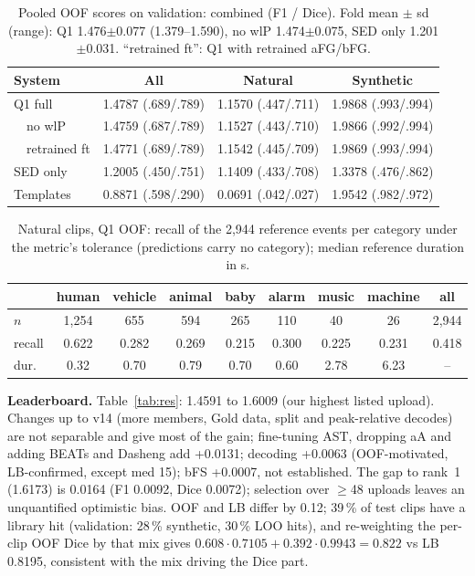 \documentclass[conference]{IEEEtran}
\begin{document}
\begin{table}[t]
\caption{Pooled OOF scores on validation: combined (F1 / Dice). Fold mean $\pm$ sd (range): Q1 1.476$\pm$0.077
(1.379--1.590), no wlP 1.474$\pm$0.075, SED only 1.201$\pm$0.031. ``retrained ft'': Q1 with retrained aFG/bFG.}
\label{tab:comp}
\centering
\scriptsize
\setlength{\tabcolsep}{3pt}
\begin{tabular}{@{}lccc@{}}
\toprule
System & All & Natural & Synthetic \\
\midrule
Q1 full & 1.4787 (.689/.789) & 1.1570 (.447/.711) & 1.9868 (.993/.994) \\
\ \ no wlP & 1.4759 (.687/.789) & 1.1527 (.443/.710) & 1.9866 (.992/.994) \\
\ \ retrained ft & 1.4771 (.689/.789) & 1.1542 (.445/.709) & 1.9869 (.993/.994) \\
SED only & 1.2005 (.450/.751) & 1.1409 (.433/.708) & 1.3378 (.476/.862) \\
Templates & 0.8871 (.598/.290) & 0.0691 (.042/.027) & 1.9542 (.982/.972) \\
\bottomrule
\end{tabular}
\end{table}

\begin{table}[t]
\caption{Natural clips, Q1 OOF: recall of the 2,944 reference events per category under the metric's tolerance
(predictions carry no category); median reference duration in s.}
\label{tab:cat}
\centering
\scriptsize
\setlength{\tabcolsep}{2.5pt}
\begin{tabular}{@{}lcccccccc@{}}
\toprule
 & human & vehicle & animal & baby & alarm & music & machine & all \\
\midrule
$n$ & 1,254 & 655 & 594 & 265 & 110 & 40 & 26 & 2,944 \\
recall & 0.622 & 0.282 & 0.269 & 0.215 & 0.300 & 0.225 & 0.231 & 0.418 \\
dur. & 0.32 & 0.70 & 0.79 & 0.70 & 0.60 & 2.78 & 6.23 & -- \\
\bottomrule
\end{tabular}
\end{table}

\textbf{Leaderboard.} Table~\ref{tab:res}: 1.4591 to 1.6009 (our highest listed upload). Changes up to v14 (more
members, Gold data, split and peak-relative decodes) are not separable and give most of the gain; fine-tuning AST,
dropping aA and adding BEATs and Dasheng add +0.0131; decoding +0.0063 (OOF-motivated, LB-confirmed, except med
15); bFS +0.0007, not established. The gap to rank~1 (1.6173) is 0.0164 (F1 0.0092, Dice 0.0072); selection over
$\ge$48 uploads leaves an unquantified optimistic bias. OOF and LB differ by 0.12; 39\,\% of test clips have a
library hit (validation: 28\,\% synthetic, 30\,\% LOO hits), and re-weighting the per-clip OOF Dice by that mix
gives $0.608\cdot0.7105+0.392\cdot0.9943=0.822$ vs LB 0.8195, consistent with the mix driving the Dice part.
\end{document}
